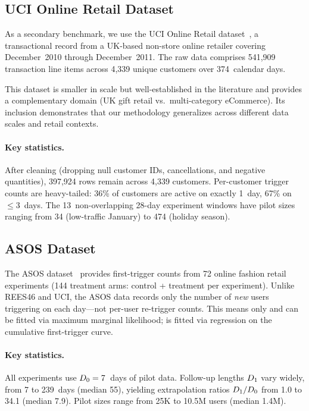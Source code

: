 \subsection{UCI Online Retail Dataset}
\label{subsec:uci_source}

As a secondary benchmark, we use the UCI Online Retail
dataset~\citep{chen2012data}, a transactional record from a
UK-based non-store online retailer covering
December~2010 through December~2011.
The raw data comprises 541,909 transaction line items across
4,339 unique customers over 374~calendar days.

This dataset is smaller in scale but well-established in the
literature and provides a complementary domain (UK gift retail
vs.\ multi-category eCommerce).
Its inclusion demonstrates that our methodology generalizes
across different data scales and retail contexts.

\paragraph{Key statistics.}
After cleaning (dropping null customer IDs, cancellations,
and negative quantities), 397,924 rows remain across 4,339
customers.
Per-customer trigger counts are heavy-tailed: 36\% of customers
are active on exactly 1~day, 67\% on $\leq 3$~days.
The 13~non-overlapping 28-day experiment windows have pilot
sizes ranging from 34 (low-traffic January) to 474 (holiday
season).

\subsection{ASOS Dataset}
\label{subsec:asos_source}

The ASOS dataset~\citep{liu2021datasets} provides first-trigger
counts from 72 online fashion retail experiments (144 treatment
arms: control + treatment per experiment).
Unlike REES46 and UCI, the ASOS data records only the number
of \emph{new} users triggering on each day---not per-user
re-trigger counts.
This means only \bemodel{} and \tgmodel{} can be fitted via
maximum marginal likelihood; \nbmodel{} is fitted via
regression on the cumulative first-trigger curve.

\paragraph{Key statistics.}
All experiments use $D_0 = 7$~days of pilot data.
Follow-up lengths $D_1$ vary widely, from 7 to 239~days
(median 55), yielding extrapolation ratios
$D_1 / D_0$ from 1.0 to 34.1 (median 7.9).
Pilot sizes range from 25K to 10.5M users
(median 1.4M).

